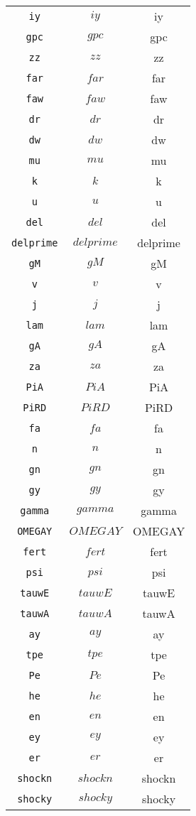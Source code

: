 \begin{center}
\begin{longtable}{ccc}
\texttt{iy} & $iy$ & iy\\
\texttt{gpc} & $gpc$ & gpc\\
\texttt{zz} & $zz$ & zz\\
\texttt{far} & $far$ & far\\
\texttt{faw} & $faw$ & faw\\
\texttt{dr} & $dr$ & dr\\
\texttt{dw} & $dw$ & dw\\
\texttt{mu} & $mu$ & mu\\
\texttt{k} & $k$ & k\\
\texttt{u} & $u$ & u\\
\texttt{del} & $del$ & del\\
\texttt{delprime} & $delprime$ & delprime\\
\texttt{gM} & $gM$ & gM\\
\texttt{v} & $v$ & v\\
\texttt{j} & $j$ & j\\
\texttt{lam} & $lam$ & lam\\
\texttt{gA} & $gA$ & gA\\
\texttt{za} & $za$ & za\\
\texttt{PiA} & $PiA$ & PiA\\
\texttt{PiRD} & $PiRD$ & PiRD\\
\texttt{fa} & $fa$ & fa\\
\texttt{n} & $n$ & n\\
\texttt{gn} & $gn$ & gn\\
\texttt{gy} & $gy$ & gy\\
\texttt{gamma} & $gamma$ & gamma\\
\texttt{OMEGAY} & $OMEGAY$ & OMEGAY\\
\texttt{fert} & $fert$ & fert\\
\texttt{psi} & $psi$ & psi\\
\texttt{tauwE} & $tauwE$ & tauwE\\
\texttt{tauwA} & $tauwA$ & tauwA\\
\texttt{ay} & $ay$ & ay\\
\texttt{tpe} & $tpe$ & tpe\\
\texttt{Pe} & $Pe$ & Pe\\
\texttt{he} & $he$ & he\\
\texttt{en} & $en$ & en\\
\texttt{ey} & $ey$ & ey\\
\texttt{er} & $er$ & er\\
\texttt{shockn} & $shockn$ & shockn\\
\texttt{shocky} & $shocky$ & shocky\\

\end{longtable}
\end{center}
